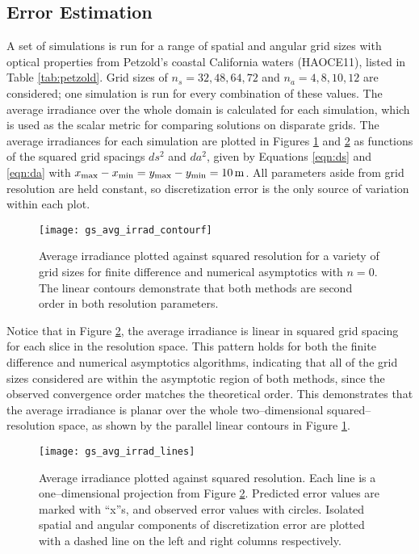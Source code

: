 \subsection{Error Estimation}
A set of simulations is run for a range of spatial and angular grid sizes with optical properties from Petzold's coastal California waters (HAOCE11), listed in Table \ref{tab:petzold}.
Grid sizes of $n_s=32,48,64,72$ and $n_a=4,8,10,12$ are considered; one simulation is run for every combination of these values.
The average irradiance over the whole domain is calculated for each simulation, which is used as the scalar metric for comparing solutions on disparate grids.
The average irradiances for each simulation are plotted in Figures \ref{fig:gs_avg_irrad_contourf} and \ref{fig:gs_avg_irrad_lines} as functions of the squared grid spacings $ds^2$ and $da^2$, given by Equations \eqref{eqn:ds} and \eqref{eqn:da} with $\xmax-\xmin = \ymax-\ymin = \SI{10}{\m}$.
All parameters aside from grid resolution are held constant, so discretization error is the only source of variation within each plot.

\begin{figure}[H]
  \centering
  \texttt{[image: gs\_avg\_irrad\_contourf]}
  \caption{Average irradiance plotted against squared resolution for a variety of grid sizes for finite difference and numerical asymptotics with $n=0$. The linear contours demonstrate that both methods are second order in both resolution parameters.}
  \label{fig:gs_avg_irrad_contourf}
\end{figure}

Notice that in Figure \ref{fig:gs_avg_irrad_lines}, the average irradiance is linear in squared grid spacing for each slice in the resolution space.
This pattern holds for both the finite difference and numerical asymptotics algorithms, indicating that all of the grid sizes considered are within the asymptotic region of both methods, since the observed convergence order matches the theoretical order.
This demonstrates that the average irradiance is planar over the whole two--dimensional squared--resolution space, as shown by the parallel linear contours in Figure \ref{fig:gs_avg_irrad_contourf}.


\begin{figure}[H]
  \centering
  \texttt{[image: gs\_avg\_irrad\_lines]}
  \caption{Average irradiance plotted against squared resolution. Each line is a one--dimensional projection from Figure \ref{fig:gs_avg_irrad_lines}. Predicted error values are marked with ``x''s, and observed error values with circles. Isolated spatial and angular components of discretization error are plotted with a dashed line on the left and right columns respectively.}
  \label{fig:gs_avg_irrad_lines}
\end{figure}



